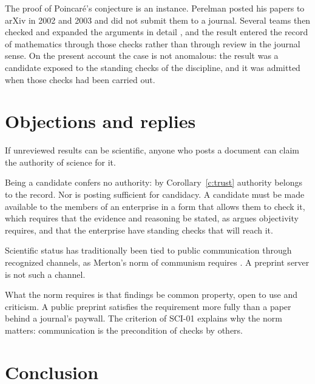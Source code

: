 \documentclass{situationist-preprint}
\begin{document}
The proof of Poincaré's conjecture is an instance. Perelman posted his papers to arXiv in 2002 and 2003 and did not submit them to a journal. Several teams then checked and expanded the arguments in detail \citep{KleinerLott2008}, and the result entered the record of mathematics through those checks rather than through review in the journal sense. On the present account the case is not anomalous: the result was a candidate exposed to the standing checks of the discipline, and it was admitted when those checks had been carried out.

\section{Objections and replies}\label{s:objections}

\begin{objection}[Gatekeeping]
If unreviewed results can be scientific, anyone who posts a document can claim the authority of science for it.
\end{objection}

\begin{reply}
Being a candidate confers no authority: by Corollary~\ref{c:trust} authority belongs to the record. Nor is posting sufficient for candidacy. A candidate must be made available to the members of an enterprise in a form that allows them to check it, which requires that the evidence and reasoning be stated, as \citet{Longino1990} argues objectivity requires, and that the enterprise have standing checks that will reach it.
\end{reply}

\begin{objection}
Scientific status has traditionally been tied to public communication through recognized channels, as Merton's norm of communism requires \citep{Merton1973}. A preprint server is not such a channel.
\end{objection}

\begin{reply}
What the norm requires is that findings be common property, open to use and criticism. A public preprint satisfies the requirement more fully than a paper behind a journal's paywall. The criterion of SCI-01 explains why the norm matters: communication is the precondition of checks by others.
\end{reply}

\section{Conclusion}\label{s:conclusion}
\end{document}
